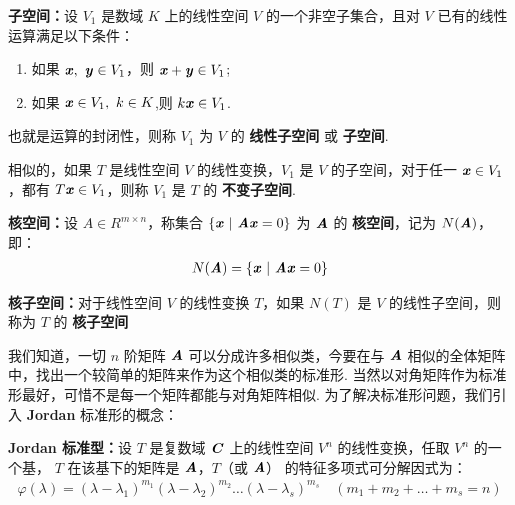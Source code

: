             \par \textbf{子空间：}设 $V_1$ 是数域 $K$ 上的线性空间 $V$ 的一个非空子集合，且对 $V$ 已有的线性运算满足以下条件：
            \begin{enumerate}
                \item 如果 $\textbf{\textit{x}}, \ \textbf{\textit{y}} \in V_1$，则 $\textbf{\textit{x}} + \textbf{\textit{y}} \in V_1$;
                \item 如果 $\textbf{\textit{x}} \in V_1, \ k \in K$,则 $k\textbf{\textit{x}} \in V_1$.            
            \end{enumerate}
            也就是运算的封闭性，则称 $V_1$ 为 $V$ 的 \textbf{线性子空间} 或 \textbf{子空间}.
            \par 相似的，如果 $T$ 是线性空间 $V$ 的线性变换，$V_1$ 是 $V$ 的子空间，对于任一 $\textbf{\textit{x}} \in V_1$，都有 $T\textbf{\textit{x}} \in V_1$，则称 $V_1$ 是 $T$ 的 \textbf{不变子空间}.
            \\
            \par \textbf{核空间：}设 $A \in R^{m \times n}$，称集合 $\{\textbf{\textit{x}} \ | \ \textbf{\textit{A}}\textbf{\textit{x}} = 0\}$ 为 $\textbf{\textit{A}}$ 的 \textbf{核空间}，记为 $N(\textbf{\textit{A}})$，即：
            \begin{align*}
                N(\textbf{\textit{A}}) = \{\textbf{\textit{x}} \ | \ \textbf{\textit{A}}\textbf{\textit{x}} = 0\}
            \end{align*}
            \par \textbf{核子空间：}对于线性空间 $V$ 的线性变换 $T$，如果 $N(T)$ 是 $V$ 的线性子空间，则称为 $T$ 的 \textbf{核子空间}
            \par 我们知道，一切 $n$ 阶矩阵 $\textbf{\textit{A}}$ 可以分成许多相似类，今要在与 $\textbf{\textit{A}}$ 相似的全体矩阵中，找出一个较简单的矩阵来作为这个相似类的标准形. 当然以对角矩阵作为标准形最好，可惜不是每一个矩阵都能与对角矩阵相似. 为了解决标准形问题，我们引入 \textbf{Jordan} 标准形的概念：
            \par \textbf{Jordan 标准型：}设 $T$ 是复数域 $\textbf{\textit{C}}$ 上的线性空间 $V^n$ 的线性变换，任取 $V^n$ 的一个基， $T$ 在该基下的矩阵是 $\textbf{\textit{A}}$，$T$（或 $\textbf{\textit{A}}$） 的特征多项式可分解因式为：
            \begin{align*}
                \varphi(\lambda) = (\lambda - \lambda_1)^{m_1}(\lambda - \lambda_2)^{m_2}\dots(\lambda - \lambda_s)^{m_s} \quad (m_1 + m_2 + \dots + m_s = n)
            \end{align*}
